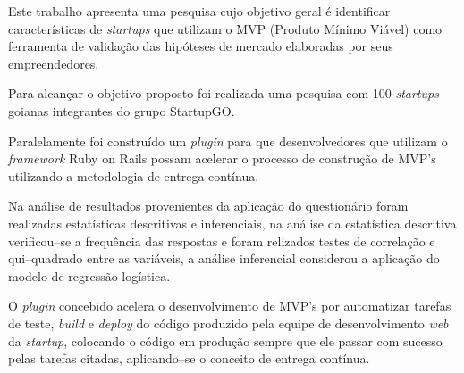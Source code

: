 
\begin{resumo} 

Este trabalho apresenta uma pesquisa cujo objetivo geral \'e identificar caracter\'isticas de \emph{startups} que utilizam o MVP (Produto M\'inimo Vi\'avel) como ferramenta de valida\c{c}\~ao das hip\'oteses de mercado elaboradas por seus empreendedores.

Para alcan\c{c}ar o objetivo proposto foi realizada uma pesquisa com 100 \emph{startups} goianas integrantes do grupo StartupGO.

Paralelamente foi constru\'ido um \emph{plugin} para que desenvolvedores que utilizam o \emph{framework} Ruby on Rails possam acelerar o processo de constru\c{c}\~ao de MVP's utilizando a metodologia de entrega cont\'inua.

Na an\'alise de resultados provenientes da aplica\c{c}\~ao do question\'ario foram realizadas estat\'isticas descritivas e inferenciais, na an\'alise da estat\'istica descritiva verificou--se a frequ\^encia das respostas e foram relizados testes de correla\c{c}\~ao e qui--quadrado entre as vari\'aveis, a an\'alise inferencial considerou a aplica\c{c}\~ao do modelo de regress\~ao log\'istica.

O \emph{plugin} concebido acelera o desenvolvimento de MVP's por automatizar tarefas de teste, \emph{build} e \emph{deploy} do c\'odigo produzido pela equipe de desenvolvimento \emph{web} da \emph{startup}, colocando o c\'odigo em produ\c{c}\~ao sempre que ele passar com sucesso pelas tarefas citadas, aplicando--se o conceito de entrega cont\'inua.

\end{resumo}

